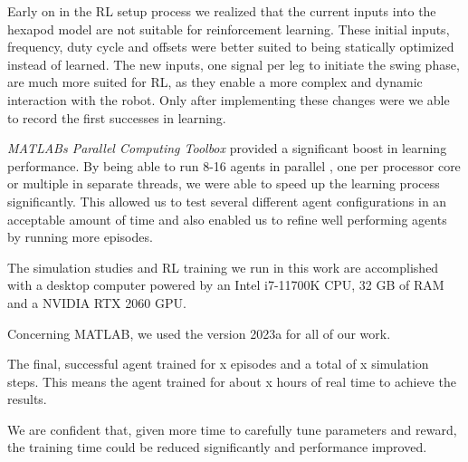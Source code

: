 Early on in the RL setup process we realized that the current inputs into the hexapod model are not suitable for reinforcement learning.
These initial inputs, frequency, duty cycle and offsets were better suited to being statically optimized instead of learned.
The new inputs, one signal per leg to initiate the swing phase, are much more suited for RL, as they enable a more complex and dynamic interaction with the robot.
Only after implementing these changes were we able to record the first successes in learning.


\textit{MATLABs Parallel Computing Toolbox} provided a significant boost in learning performance.
By being able to run 8-16 agents in parallel , one per processor core or multiple in separate threads, we were able to speed up the learning process significantly.
This allowed us to test several different agent configurations in an acceptable amount of time and also enabled us to refine well performing agents by running more episodes.

The simulation studies and RL training we run in this work are accomplished with a desktop computer powered by an Intel i7-11700K CPU, 32 GB of RAM and a NVIDIA RTX 2060 GPU.

Concerning MATLAB, we used the version 2023a for all of our work.


The final, successful agent trained for x episodes and a total of x simulation steps. 
This means the agent trained for about x hours of real time to achieve the results.

We are confident that, given more time to carefully tune parameters and reward, the training time could be reduced significantly and performance improved.

